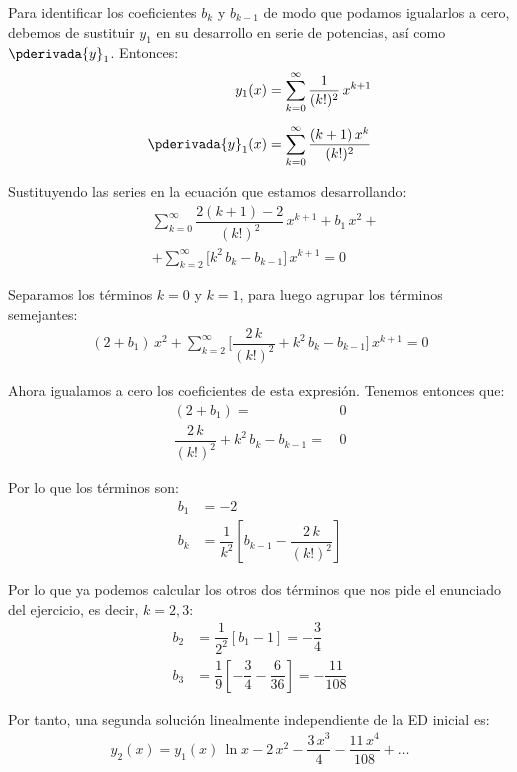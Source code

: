 \begin{ejemplo}
Para identificar los coeficientes $b_{k}$ y $b_{k-1}$ de modo que podamos igualarlos a cero, debemos de sustituir $y_{1}$ en su desarrollo en serie de potencias, así como $\pderivada{y}_{1}$. Entonces:
\begin{align*}
y_{1}(x) &= \sum_{k=0}^{\infty} \dfrac{1}{(k!)^{2}} \, x^{k+1}\\[0.5em] 
\pderivada{y}_{1} (x) &= \sum_{k=0}^{\infty} \dfrac{(k+1) \, x^{k}}{(k!)^{2}}
\end{align*}

Sustituyendo las series en la ecuación que estamos desarrollando:
\begin{align*}
&\sum_{k=0}^{\infty} \dfrac{2(k + 1) - 2}{(k!)^{2}} \, x^{k+1} + b_{1} \, x^{2} + \\[0.5em]
&+ \sum_{k=2}^{\infty} \bigg[ k^{2} \, b_{k} - b_{k-1} \bigg] \, x^{k+1} = 0
\end{align*}

Separamos los términos $k = 0$ y $k = 1$, para luego agrupar los términos semejantes:
\begin{align*}
(2 + b_{1}) \, x^{2} + \sum_{k=2}^{\infty} \bigg[ \dfrac{2 \, k}{(k!)^2} + k^{2} \, b_{k} - b_{k-1} \bigg] \, x^{k+1} = 0
\end{align*}

Ahora igualamos a cero los coeficientes de esta expresión. Tenemos entonces que:
\begin{align*}
(2 + b_{1}) =& \, 0 \\[1em]
\dfrac{2 \, k}{(k!)^2} + k^{2} \, b_{k} - b_{k-1} =& \, 0
\end{align*}

Por lo que los términos son:
\begin{align*}
b_{1} &= -2 \\[0.5em]
b_{k} &= \dfrac{1}{k^{2}} \left[ b_{k-1} - \dfrac{2 \, k}{(k!)^{2}} \right]
\end{align*}

Por lo que ya podemos calcular los otros dos términos que nos pide el enunciado del ejercicio, es decir, $k = 2, 3$:
\begin{align*}
b_{2} &= \dfrac{1}{2^{2}} [b_{1} - 1] = - \dfrac{3}{4} \\[0.5em]
b_{3} &= \dfrac{1}{9} \left[ -\dfrac{3}{4} - \dfrac{6}{36} \right] = - \dfrac{11}{108}
\end{align*}

Por tanto, una segunda solución linealmente independiente de la ED inicial es:
\begin{align*}
y_{2}(x) = y_{1}(x) \, \ln x - 2 \, x^{2} - \dfrac{3 \, x^{3}}{4} - \dfrac{11 \, x^{4}}{108} + \ldots
\end{align*}


\end{ejemplo}

